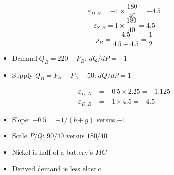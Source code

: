 \begin{frame}[plain,label=w2_25_we9a]
  \Large
  \[
    \tag{82}\;\varepsilon_{D,B} = -1 \times \frac{180}{40} = -4.5
  \]
  \[
    \tag{83}\;\varepsilon_{S,B} = 1 \times \frac{180}{40} = 4.5
  \]
  \[
    \tag{84}\;\rho_B = \frac{4.5}{4.5 + 4.5} = \frac{1}{2}
  \]

  \vspace{0.3em}
  \begin{itemize}\Large
    \item Demand $Q_B = 220 - P_B$: $dQ/dP = -1$
    \item Supply $Q_B = P_B - P_N - 50$: $dQ/dP = 1$
  \end{itemize}
\end{frame}

\begin{frame}[plain,label=w2_26_we9b]
  \Large
  \begin{align*}
    \tag{85}\;\varepsilon_{D,N} &= -0.5 \times 2.25 = -1.125\\
    \tag{86}\;\varepsilon_{D,B} &= -1 \times 4.5 = -4.5
  \end{align*}

  \vspace{0.3em}
  \begin{itemize}\Large
    \item Slope: $-0.5 = -1/(b + g)$ versus $-1$
    \item Scale $P/Q$: $90/40$ versus $180/40$
    \item Nickel is half of a battery's $MC$
    \item Derived demand is less elastic
  \end{itemize}
\end{frame}


